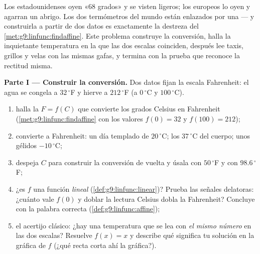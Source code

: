 \begin{problem}
\label{pb:g9:linfunc:1}
Los estadounidenses oyen «$68$ grados» y se visten ligeros; los europeos lo oyen
y agarran un abrigo. Los dos termómetros del mundo están enlazados
por una  --- y construirla a partir de dos datos es
exactamente la destreza del \cref{met:g9:linfunc:findaffine}. Este
problema construye la conversión, halla la inquietante temperatura en la
que las dos escalas coinciden, después lee taxis, grillos y
velas con las mismas gafas, y termina con la prueba
que reconoce la rectitud misma.

\medskip
\noindent\textbf{Parte I --- Construir la conversión.}
Dos datos fijan la escala Fahrenheit: el agua se congela a
$32\,^\circ$F y hierve a $212\,^\circ$F (a $0\,^\circ$C y
$100\,^\circ$C).
\begin{enumerate}
  \item halla la  $F = f(C)$ que convierte los grados Celsius
        en Fahrenheit (\cref{met:g9:linfunc:findaffine} con
        los valores $f(0) = 32$ y $f(100) = 212$);
  \item convierte a Fahrenheit: un día templado de $20\,^\circ$C; los
        $37\,^\circ$C del cuerpo; unos gélidos $-10\,^\circ$C;
  \item despeja $C$ para construir la conversión de vuelta y úsala
        con $50\,^\circ$F y con $98.6\,^\circ$F;
  \item ¿es $f$ una función \emph{lineal}
        (\cref{def:g9:linfunc:linear})? Prueba las señales delatoras:
        ¿cuánto vale $f(0)$ y doblar la lectura Celsius
        dobla la Fahrenheit? Concluye con la palabra correcta
        (\cref{def:g9:linfunc:affine});
  \item el acertijo clásico: ¿hay una temperatura que se lea con
        \emph{el mismo número} en las dos escalas? Resuelve
        $f(x) = x$ y describe qué significa tu solución en la
        gráfica de $f$ (¿qué recta corta ahí la gráfica?).
\end{enumerate}


\end{problem}
